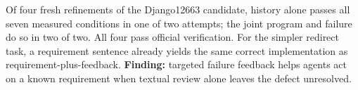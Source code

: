 Of four fresh refinements of the Django12663 candidate, history alone passes
all seven measured conditions in one of two attempts; the joint program and
failure do so in two of two. All four pass official verification. For the
simpler redirect task, a requirement sentence already yields the same correct
implementation as requirement-plus-feedback.
\textbf{Finding:} targeted failure feedback helps agents act on a known
requirement when textual review alone leaves the defect unresolved.
